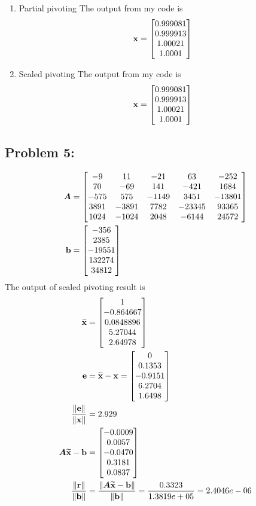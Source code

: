 \documentclass{article}
\begin{document}
\begin{enumerate}[label=(\alph*)]
\begin{enumerate}[label=(\roman*)] 
\item Partial pivoting 
The output from my code is \begin{align*} \boldsymbol{\mathrm{x}} = \begin{bmatrix} 0.999081 \\ 0.999913 \\ 1.00021 \\ 1.0001  \end{bmatrix} \end{align*} 
\item Scaled pivoting 
The output from my code is \begin{align*} \boldsymbol{\mathrm{x}} = \begin{bmatrix} 0.999081 \\ 0.999913 \\ 1.00021 \\ 1.0001  \end{bmatrix} \end{align*} 
\end{enumerate} 
\end{enumerate} 

\hypertarget{problem_0_homework_checklist_2}{}
\subsection*{{Problem 5: }}
\label{}
\begin{align*}
\boldsymbol{A} &= \begin{bmatrix} -9 & 11 & -21 & 63 & -252 \\ 
			70 & -69 & 141 & - 421 & 1684 \\
			-575 & 575 & -1149 & 3451 & -13801 \\
			3891 & -3891 & 7782 & -23345 & 93365 \\
			1024 & -1024 & 2048 & -6144 & 24572  \end{bmatrix}\\
\boldsymbol{\mathrm{b}} & = \begin{bmatrix} -356 \\ 2385 \\ -19551 \\ 132274 \\ 34812  \end{bmatrix}
\end{align*} 
The output of scaled pivoting result is 
\begin{align*}
 \widetilde{\boldsymbol{\mathrm{x}}} &= \begin{bmatrix} 1 \\ -0.864667 \\ 0.0848896 \\ 5.27044 \\ 2.64978 \end{bmatrix} \\
 \boldsymbol{\mathrm{e}} &= \widetilde{\boldsymbol{\mathrm{x}}} - \boldsymbol{\mathrm{x}}  = \begin{bmatrix} 0  \\  0.1353  \\ -0.9151 \\   6.2704    \\1.6498  \end{bmatrix} \\
\frac{ \|\boldsymbol{\mathrm{e}}\|}{\|\boldsymbol{\mathrm{x}}\|} &= 2.929\\
\boldsymbol{A}\widetilde{\boldsymbol{\mathrm{x}}}-\boldsymbol{\mathrm{b}} &= \begin{bmatrix} -0.0009\\   0.0057\\   -0.0470\\    0.3181\\    0.0837 \end{bmatrix}\\
\frac{ \|\boldsymbol{\mathrm{r}}\|}{\|\boldsymbol{\mathrm{b}}\|} & = \frac{ \|\boldsymbol{A}\widetilde{\boldsymbol{\mathrm{x}}}-\boldsymbol{\mathrm{b}}\|}{\|\boldsymbol{\mathrm{b}}\|}= \frac{0.3323}{1.3819e+05}=2.4046e-06\\
 \end{align*} 
\end{document}
